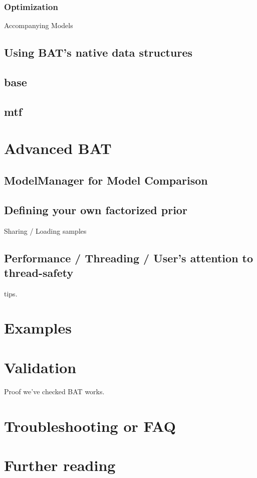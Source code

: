 \documentclass[11pt, a4paper]{article}
\newcommand{\dan}[1]{{\color{red}{Dan: #1}}}
\newcommand{\fred}[1]{{\color{blue}{Fred: #1}}}
\begin{document}
\subsubsection{Optimization}
\fred

\section{Accompanying Models}

\subsection{Using BAT's native data structures}

\subsection{base}

\subsection{mtf}


\section{Advanced BAT}

\subsection{ModelManager for Model Comparison}
\fred{can work on same data set but not required}


\subsection{Defining your own factorized prior}
\dan

\subsection{Sharing / Loading samples}
\dan{describe that files can be checked during prerun if \#136 is merged}

\subsection{Performance / Threading / User's attention to thread-safety}

tips.

\section{Examples}

\section{Validation}

Proof we've checked BAT works.

\section{Troubleshooting or FAQ}

\section{Further reading}
\end{document}
